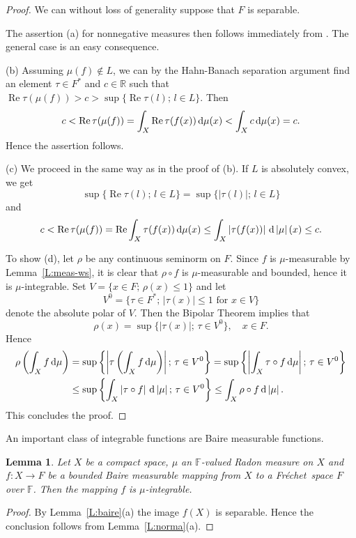\documentclass{amsart}
\numberwithin{equation}{section}
\newtheorem{lemma}[thm]{Lemma}
\theoremstyle{definition}
\def\ef{\mathbb F}
\def\er{\mathbb R}
\def\di{\,\mbox{\rm d}}
\newcommand{\abs}[1]{\left| #1  \right|}
\renewcommand{\Re}{\operatorname{Re}}
\newcommand{\setsep}{;\,}
\newcommand{\fr}{Fr\'echet\ }
\begin{document}
\begin{proof} We can without loss of generality suppose that $F$ is separable.

The assertion (a) for nonnegative measures then follows immediately from  \cite[Corollary~3.1]{thomas}.
The general case is an easy consequence.

(b) Assuming $\mu(f)\notin L$, we can by the Hahn-Banach separation argument find an element $\tau\in F^*$ and $c\in\er$ such that  $\Re\tau(\mu(f))>c>\sup \{\Re \tau(l)\setsep l\in L\}$.
Then
\[
c<\Re\tau(\mu(f))=\int_X \Re \tau(f(x))\di\mu(x)< \int_X c\di\mu(x)=c.
\]
Hence the assertion follows.

(c) We proceed in the same way as in the proof of (b). If $L$ is absolutely convex, we get
$$\sup \{\Re \tau(l)\setsep l\in L\}=\sup \{\abs{\tau(l)}\setsep l\in L\}$$
and
\[
c<\Re\tau(\mu(f))=\Re \int_X  \tau(f(x))\di\mu(x)\le\int_X \abs{\tau(f(x))}\di\abs{\mu}(x) \le c.
\]

To show (d), let $\rho$ be any continuous seminorm on $F$. Since $f$ is $\mu$-measurable by Lemma~\ref{L:meas-ws}, it is clear that $\rho\circ f$ is $\mu$-measurable and bounded, hence it is $\mu$-integrable. Set $V=\{x\in F\setsep\rho(x)\le 1\}$ and let
\[
V^0=\{\tau\in F^*\setsep \abs{\tau(x)}\le 1\mbox{ for }x\in V\}
\]
denote the absolute polar of $V$. Then the Bipolar Theorem implies that
\[
\rho(x)=\sup\{\abs{\tau(x)}\setsep \tau\in V^0\},\quad x\in F.
\]
Hence
\[
\begin{aligned}
\rho\left(\int_X f\di\mu\right)&=\sup\left\{\abs{\tau\left(\int_X f\di\mu\right)}\setsep \tau\in V^0\right\}
=\sup\left\{\abs{\int_X \tau\circ f\di\mu}\setsep \tau\in V^0\right\}\\
&\le \sup\left\{\int_X \abs{\tau\circ f}\di\abs{\mu}\setsep \tau\in V^0\right\}
\le \int_X \rho\circ f\di\abs{\mu}.
\end{aligned}
\]
This concludes the proof.

\end{proof}

An important class of integrable functions are Baire measurable functions.

\begin{lemma}
\label{L:integr-for-baire}
Let $X$ be a compact space, $\mu$ an $\ef$-valued Radon measure on $X$ and $f\colon X\to F$ be a bounded Baire measurable mapping from $X$ to a \fr space $F$ over $\ef$. Then the mapping $f$ is  $\mu$-integrable.
\end{lemma}

\begin{proof}
By Lemma~\ref{L:baire}(a) the image $f(X)$ is separable. Hence the conclusion follows from Lemma~\ref{L:norma}(a).
\end{proof}
\end{document}
